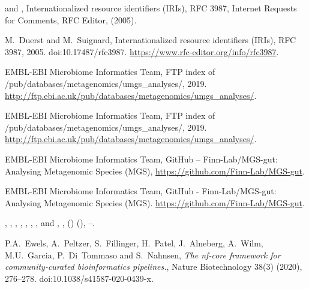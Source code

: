 \documentclass[ds,v1.1.2,openaccess]{iosart2x}%
\begin{document}
\begin{thebibliography}{}
%
\begin{botherref}
 and
,
Internationalized resource identifiers ({IRI}s),
RFC 3987,
Internet Requests for Comments,
RFC Editor,
\byear(2005).
\end{botherref}
%
\OrigBibText
M.~Duerst and
M.~Suignard,
Internationalized resource identifiers ({IRI}s),
RFC 3987,
2005.
doi:10.17487/rfc3987.
\url{https://www.rfc-editor.org/info/rfc3987}.
\endOrigBibText
{}
\endbibitem

%
\begin{botherref}
{EMBL-EBI Microbiome Informatics Team},
{FTP} index of /pub/databases/metagenomics/umgs\_analyses/,
2019.
\url{http://ftp.ebi.ac.uk/pub/databases/metagenomics/umgs\_analyses/}.
\end{botherref}
%
\OrigBibText
{EMBL-EBI Microbiome Informatics Team},
{FTP} index of /pub/databases/metagenomics/umgs\_analyses/,
2019.
\url{http://ftp.ebi.ac.uk/pub/databases/metagenomics/umgs\_analyses/}.
\endOrigBibText
{}
\endbibitem

%
\begin{botherref}
EMBL-EBI Microbiome Informatics Team,
{GitHub} -- Finn-Lab/{MGS}-gut: Analysing Metagenomic Species ({MGS}),
\url{https://github.com/Finn-Lab/MGS-gut}.
\end{botherref}
%
\OrigBibText
{EMBL-EBI Microbiome Informatics Team},
{GitHub} - Finn-Lab/{MGS}-gut: Analysing Metagenomic Species ({MGS}).
\url{https://github.com/Finn-Lab/MGS-gut}.
\endOrigBibText
{}
\endbibitem

%
\begin{barticle}
,
,
,
,
,
,
,
 and
,
,
()
(),
--.
\end{barticle}
%
\OrigBibText
P.A.~Ewels,
A.~Peltzer,
S.~Fillinger,
H.~Patel,
J.~Alneberg,
A.~Wilm,
M.U.~Garcia,
P.~Di~Tommaso and
S.~Nahnsen,
\textit{The nf-core framework for community-curated bioinformatics
pipelines.},
Nature Biotechnology
38(3)
(2020),
276--278.
doi:10.1038/s41587-020-0439-x.
\endOrigBibText
{}
\endbibitem


\end{thebibliography}
\end{document}
